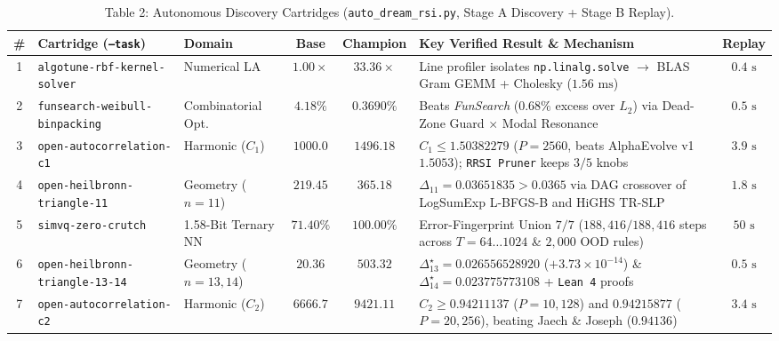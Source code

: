 \documentclass[11pt,a4paper]{article}
\begin{document}
\begin{table}[ht!]
\centering
\caption{Table 2: Autonomous Discovery Cartridges (\texttt{auto\_dream\_rsi.py}, Stage A Discovery + Stage B Replay).}
\label{tab:cartridges}
\footnotesize
\begin{tabular}{cp{3.5cm}p{2.3cm}ccp{4.6cm}c}
\toprule
\# & \textbf{Cartridge (\texttt{--task})} & \textbf{Domain} & \textbf{Base} & \textbf{Champion} & \textbf{Key Verified Result \& Mechanism} & \textbf{Replay} \\
\midrule
1 & \texttt{algotune-rbf-kernel-solver} & Numerical LA & $1.00\times$ & $\mathbf{33.36\times}$ & Line profiler isolates \texttt{np.linalg.solve} $\to$ BLAS Gram GEMM + Cholesky ($1.56\text{ ms}$) & $0.4\text{ s}$ \\
2 & \texttt{funsearch-weibull-binpacking} & Combinatorial Opt. & $4.18\%$ & $\mathbf{0.3690\%}$ & Beats \emph{FunSearch} ($0.68\%$ excess over $L_2$) via Dead-Zone Guard $\times$ Modal Resonance & $0.5\text{ s}$ \\
3 & \texttt{open-autocorrelation-c1} & Harmonic ($C_1$) & $1000.0$ & $\mathbf{1496.18}$ & $C_1 \le \mathbf{1.50382279}$ ($P=2560$, beats AlphaEvolve v1 $1.5053$); \texttt{RRSI Pruner} keeps $3/5$ knobs & $3.9\text{ s}$ \\
4 & \texttt{open-heilbronn-triangle-11} & Geometry ($n=11$) & $219.45$ & $\mathbf{365.18}$ & $\Delta_{11} = \mathbf{0.03651835} > 0.0365$ via DAG crossover of LogSumExp L-BFGS-B and HiGHS TR-SLP & $1.8\text{ s}$ \\
5 & \texttt{simvq-zero-crutch} & 1.58-Bit Ternary NN & $71.40\%$ & $\mathbf{100.00\%}$ & Error-Fingerprint Union $7/7$ ($188,416/188,416$ steps across $T=64\dots 1024$ \& $2,000$ OOD rules) & $50\text{ s}$ \\
6 & \texttt{open-heilbronn-triangle-13-14} & Geometry ($n=13,14$) & $20.36$ & $\mathbf{503.32}$ & $\Delta_{13}^\star = \mathbf{0.026556528920}$ ($+3.73\times 10^{-14}$) \& $\Delta_{14}^\star = \mathbf{0.023775773108}$ + \texttt{Lean 4} proofs & $0.5\text{ s}$ \\
7 & \texttt{open-autocorrelation-c2} & Harmonic ($C_2$) & $6666.7$ & $\mathbf{9421.11}$ & $C_2 \ge \mathbf{0.94211137}$ ($P=10,128$) and $\mathbf{0.94215877}$ ($P=20,256$), beating Jaech \& Joseph ($0.94136$) & $3.4\text{ s}$ \\
\bottomrule
\end{tabular}
\end{table}
\end{document}
